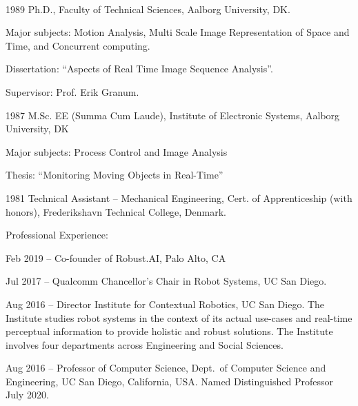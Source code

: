 \documentclass{article}
\newenvironment{sublist}{%
  \begin{list}{}{%
      \setlength{\itemsep}{0em}\setlength{\parsep}{0em}%
      \setlength{\topsep}{0em}\setlength{\parskip}{0em}%
    }%
}%
{ \end{list} }
\begin{document}
\begin{cv}
  \begin{cvlist}{~}
  \item[1989] Ph.D., Faculty of Technical Sciences, Aalborg
    University, DK.
    \begin{sublist}
    \item Major subjects: Motion Analysis, Multi Scale Image
      Representation of Space and Time, and Concurrent computing.
    \item Dissertation: ``Aspects of Real Time Image Sequence
      Analysis''.
    \item Supervisor: Prof. Erik Granum.
    \end{sublist}
  \item[1987] M.Sc. EE (Summa Cum Laude), Institute of Electronic
    Systems, Aalborg University, DK
    \begin{sublist}
    \item Major subjects: Process Control and Image Analysis
    \item Thesis: ``Monitoring Moving Objects in Real-Time''
    \end{sublist}
  \item[1981] Technical Assistant -- Mechanical Engineering, Cert.
    of Apprenticeship (with honors), Frederikshavn Technical
    College, Denmark.
\end{cvlist}



\begin{cvlist}{Professional Experience:}

\item[Feb 2019 --] Co-founder of Robust.AI, Palo Alto, CA 

\item[Jul 2017 --] Qualcomm Chancellor's Chair in Robot Systems, UC San Diego.

\item[Aug 2016 --] Director Institute for Contextual Robotics, UC San
  Diego. The Institute studies robot systems in the context of its
  actual use-cases and real-time perceptual information to provide
  holistic and robust solutions. The Institute involves four
  departments across Engineering and Social Sciences.

\item[Aug 2016 --] Professor of Computer Science, Dept.\ of Computer
  Science and Engineering, UC San Diego, California, USA. Named
  Distinguished Professor July 2020.


\end{cvlist}
\end{cv}
\end{document}

